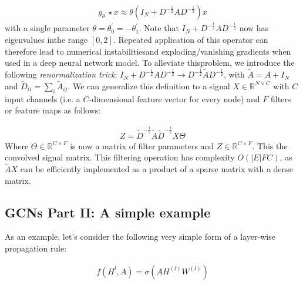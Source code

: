 \documentclass[12pt,a4paper]{article}
\begin{document}
\begin{align*}
g_{\theta^{'}} \star x \approx \theta \left(  I_{N}+D^{-\frac{1}{2}}AD^{-\frac{1}{2}} \right) x
\end{align*}
with  a  single  parameter $\theta = \theta_{0}^{'} = - \theta_{1}^{'}$. Note that $I_{N}+D^{-\frac{1}{2}}AD^{-\frac{1}{2}}$ now  has  eigenvalues  inthe range $[0,2]$. Repeated application of this operator can therefore lead to numerical instabilitiesand exploding/vanishing gradients when used in a deep neural network model.   To alleviate thisproblem, we introduce the following \textit{renormalization trick}: $I_{N}+D^{-\frac{1}{2}}AD^{-\frac{1}{2}}  \rightarrow D^{-\frac{1}{2}}\tilde{A} D^{-\frac{1}{2}}$, with $\tilde{A} = A +I_{N}$ and $\tilde{D}_{ii} = \sum_{i} \tilde{A}_{ij}$.
We can generalize this definition to a signal $X \in \mathbb{R}^{N \times C}$ with $C$ input channels (i.e. a $C$-dimensional feature vector for every node) and $F$ filters or feature maps as follows:

\begin{align*}
Z = \tilde{D}^{-\frac{1}{2}}\tilde{A}\tilde{D}^{-\frac{1}{2}}X \Theta
\end{align*}
Where $\Theta \in \mathbb{R}^{C \times F}$ is now a matrix of filter parameters and $Z \in \mathbb{R}^{C \times F}$. This the convolved signal matrix. This filtering operation has complexity $O(|E|FC)$, as $\tilde{A}X$ can be efficiently implemented as a product of a sparse matrix with a dense matrix.



\subsection*{GCNs Part II: A simple example}

As an example, let's consider the following very simple form of a layer-wise propagation rule:

\begin{align*}
f(H^{l},A) = \sigma (AH^{(l)}W^{(l)})
\end{align*}
\end{document}
